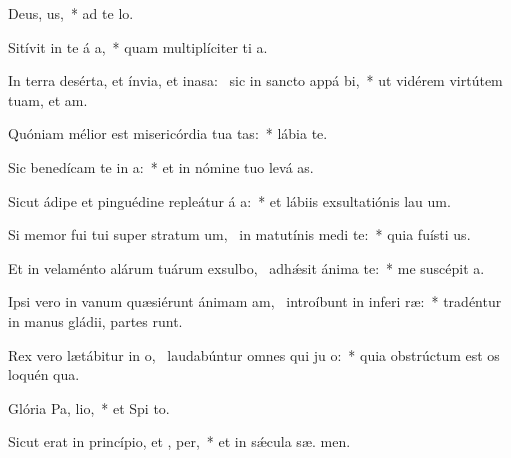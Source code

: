 \item Deus,  us,~* ad te   lo.
\item Sitívit in te á a,~* quam multiplíciter ti  a.
\item In terra desérta, et ínvia, et inasa:~\pscross{} sic in sancto appá bi,~* ut vidérem virtútem tuam, et  am.
\item Quóniam mélior est misericórdia tua  tas:~* lábia   te.
\item Sic benedícam te in  a:~* et in nómine tuo levá  as.
\item Sicut ádipe et pinguédine repleátur á a:~* et lábiis exsultatiónis lau  um.
\item Si memor fui tui super stratum um,~\pscross{} in matutínis medi  te:~* quia fuísti  us.
\item Et in velaménto alárum tuárum exsulbo,~\pscross{} adhǽsit ánima   te:~* me suscépit  a.
\item Ipsi vero in vanum quæsiérunt ánimam am,~\pscross{} introíbunt in inferi ræ:~* tradéntur in manus gládii, partes  runt.
\item Rex vero lætábitur in o,~\pscross{} laudabúntur omnes qui ju  o:~* quia obstrúctum est os loquén qua.
\item Glória Pa,  lio,~* et Spi to.
\item Sicut erat in princípio, et ,  per,~* et in sǽcula sæ. men.
